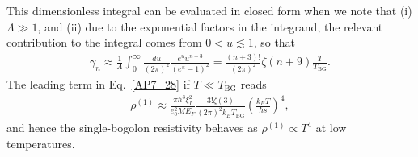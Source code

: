 This dimensionless integral can be evaluated in closed form when we note that (i) $\Lambda\gg 1$, and (ii) due to the exponential factors in the integrand, the relevant contribution to the integral comes from $0<u\lesssim 1$, so that
%
\begin{eqnarray}
\label{AP7_EqMath2}
\gamma_n\approx\frac{1}{\Lambda}\int_0^\infty\frac{du}{(2\pi)^2}\frac{e^uu^{n+3}}{(e^u-1)^2}=\frac{(n+3)!}{(2\pi)^2}\zeta(n+9)\frac{T}{T_\textrm{BG}}.
\end{eqnarray}
%
The leading term in Eq.~\eqref{AP7_28} if $T\ll T_\textrm{BG}$ reads
%
\begin{eqnarray}
\label{AP7_rho1b}
\rho^{(1)}\approx\frac{\pi\hbar^3\xi_I^2}{e_0^2ME_F}\frac{3!\zeta(3)}{(2\pi)^2k_BT_\textrm{BG}}\left(\frac{k_BT}{\hbar s}\right)^4,
\end{eqnarray}
%
and hence the single-bogolon resistivity behaves as $\rho^{(1)}\propto T^4$ at low temperatures.


